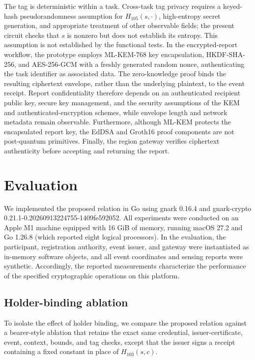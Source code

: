 \documentclass[pdflatex,iicol,sn-mathphys-num]{sn-jnl}
\begin{document}
The tag is deterministic within a task. Cross-task tag privacy requires a keyed-hash pseudorandomness assumption for $H_{105}(s,\cdot)$, high-entropy secret generation, and appropriate treatment of other observable fields; the present circuit checks that $s$ is nonzero but does not establish its entropy. This assumption is not established by the functional tests. In the encrypted-report workflow, the prototype employs ML-KEM-768 key encapsulation, HKDF-SHA-256, and AES-256-GCM with a freshly generated random nonce, authenticating the task identifier as associated data. The zero-knowledge proof binds the resulting ciphertext envelope, rather than the underlying plaintext, to the event receipt. Report confidentiality therefore depends on an authenticated recipient public key, secure key management, and the security assumptions of the KEM and authenticated-encryption schemes, while envelope length and network metadata remain observable. Furthermore, although ML-KEM protects the encapsulated report key, the EdDSA and Groth16 proof components are not post-quantum primitives. Finally, the region gateway verifies ciphertext authenticity before accepting and returning the report.


\section{Evaluation}
\label{sec:evaluation}

We implemented the proposed relation in Go using gnark 0.16.4 and gnark-crypto 0.21.1-0.20260913224755-1409fe592052. All experiments were conducted on an Apple M1 machine equipped with 16 GiB of memory, running macOS 27.2 and Go 1.26.8 (which reported eight logical processors). In the evaluation, the participant, registration authority, event issuer, and gateway were instantiated as in-memory software objects, and all event coordinates and sensing reports were synthetic. Accordingly, the reported measurements characterize the performance of the specified cryptographic operations on this platform.

\subsection{Holder-binding ablation}
To isolate the effect of holder binding, we compare the proposed relation against a bearer-style ablation that retains the exact same credential, issuer-certificate, event, context, bounds, and tag checks, except that the issuer signs a receipt containing a fixed constant in place of $H_{103}(s,c)$.
\end{document}
